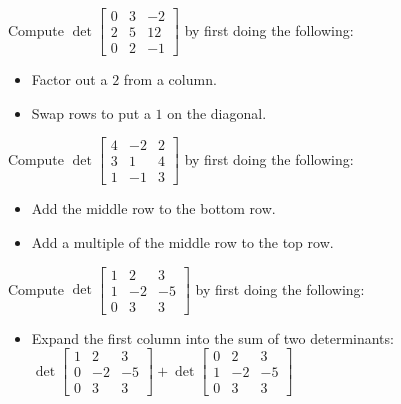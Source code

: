 \begin{applicationActivities}
\begin{activity}{5}
  Compute \(\det \begin{bmatrix} 0 & 3 & -2 \\ 2 & 5 & 12 \\ 0 & 2 & -1 \end{bmatrix}\)
  by first doing the following:
  \begin{itemize}
    \item Factor out a \(2\) from a column.
    \item Swap rows to put a \(1\) on the diagonal.
  \end{itemize}
\end{activity}

\begin{activity}{5}
  Compute \(\det \begin{bmatrix} 4 & -2 & 2 \\ 3 & 1 & 4 \\ 1 & -1 & 3\end{bmatrix}\)
  by first doing the following:
  \begin{itemize}
    \item Add the middle row to the bottom row.
    \item Add a multiple of the middle row to the top row.
  \end{itemize}
\end{activity}

\begin{activity}{10}
  Compute \(\det \begin{bmatrix} 1 & 2 & 3 \\ 1 & -2 & -5 \\ 0 & 3 & 3 \end{bmatrix}\)
  by first doing the following:
  \begin{itemize}
    \item Expand the first column into the sum of two determinants:
    \(
      \det \begin{bmatrix} 1 & 2 & 3 \\ 0 & -2 & -5 \\ 0 & 3 & 3 \end{bmatrix}   
      +\det \begin{bmatrix} 0 & 2 & 3 \\ 1 & -2 & -5 \\ 0 & 3 & 3 \end{bmatrix}   
    \) 
  \end{itemize}
\end{activity}


\end{applicationActivities}
